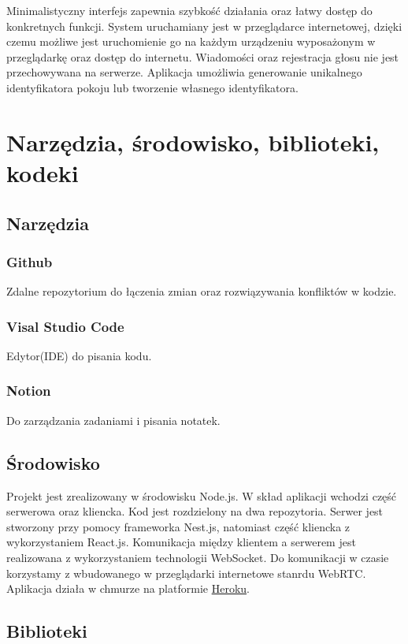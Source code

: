 \documentclass{article}
\begin{document}
Minimalistyczny interfejs zapewnia szybkość działania oraz łatwy dostęp do konkretnych funkcji. System uruchamiany jest w przeglądarce internetowej, dzięki czemu możliwe jest uruchomienie go na każdym urządzeniu wyposażonym w przeglądarkę oraz dostęp do internetu. Wiadomości oraz rejestracja głosu nie jest przechowywana na serwerze. Aplikacja umożliwia generowanie unikalnego identyfikatora pokoju lub tworzenie własnego identyfikatora.

\section{Narzędzia, środowisko, biblioteki, kodeki}

\subsection{Narzędzia}

\subsubsection{Github}
Zdalne repozytorium do łączenia zmian oraz rozwiązywania konfliktów w kodzie.

\subsubsection{Visal Studio Code}
Edytor(IDE) do pisania kodu.

\subsubsection{Notion}
Do zarządzania zadaniami i pisania notatek.

\subsection{Środowisko}
Projekt jest zrealizowany w środowisku Node.js. W skład aplikacji wchodzi część serwerowa oraz kliencka. Kod jest rozdzielony na dwa repozytoria. Serwer jest stworzony przy pomocy frameworka Nest.js, natomiast część kliencka z wykorzystaniem React.js. Komunikacja między klientem a serwerem jest realizowana z wykorzystaniem technologii WebSocket. Do komunikacji w czasie korzystamy z wbudowanego w przeglądarki internetowe stanrdu WebRTC. Aplikacja działa w chmurze na platformie \href{https://dashboard.heroku.com/apps}{Heroku}.

\subsection{Biblioteki}
\end{document}
